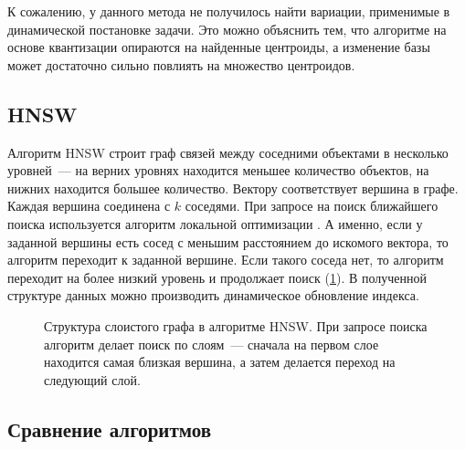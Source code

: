 \documentclass[a4paper,12pt]{extarticle}
\begin{document}
К сожалению, у данного метода не получилось найти вариации, применимые в динамической постановке задачи. Это можно объяснить тем, что алгоритме на основе квантизации опираются на найденные центроиды, а изменение базы может достаточно сильно повлиять на множество центроидов.

\subsection{HNSW}
\label{HNSW}


Алгоритм HNSW \cite{DBLP:journals/corr/MalkovY16} строит граф связей между соседними объектами в несколько уровней~--- на верних уровнях находится меньшее количество объектов, на нижних находится большее количество. Вектору соответствует вершина в графе. Каждая вершина соединена с $k$ соседями. При запросе на поиск ближайшего поиска используется алгоритм локальной оптимизации \cite{hnwspics}. А именно, если у заданной вершины есть сосед с меньшим расстоянием до искомого вектора, то алгоритм переходит к заданной вершине. Если такого соседа нет, то алгоритм переходит на более низкий уровень и продолжает поиск (\cref{ris:hnsw_graph}). В полученной структуре данных можно производить динамическое обновление индекса.

\begin{center}
\begin{figure}[H]
\caption{Структура слоистого графа в алгоритме HNSW. При запросе поиска алгоритм делает поиск по слоям~--- сначала на первом слое находится самая близкая вершина, а затем делается переход на следующий слой.}
\label{ris:hnsw_graph}
\end{figure}
\end{center}

\subsection{Сравнение алгоритмов}
\end{document}
